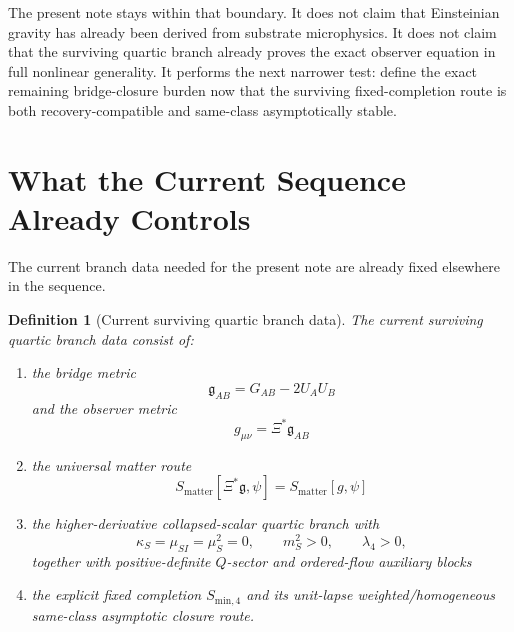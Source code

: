 \documentclass[11pt]{article}
\newcommand{\BridgeMetric}{\mathfrak{g}}
\newtheorem{definition}{Definition}
\begin{document}
The present note stays within that boundary. It does not claim that Einsteinian gravity has already been derived from substrate microphysics. It does not claim that the surviving quartic branch already proves the exact observer equation in full nonlinear generality. It performs the next narrower test: define the exact remaining bridge-closure burden now that the surviving fixed-completion route is both recovery-compatible and same-class asymptotically stable.

\section{What the Current Sequence Already Controls}

The current branch data needed for the present note are already fixed elsewhere in the sequence.

\begin{definition}[Current surviving quartic branch data]
\label{def:branch}
The \emph{current surviving quartic branch data} consist of:
\begin{enumerate}
    \item the bridge metric
    \begin{equation}
    \BridgeMetric_{AB}=G_{AB}-2U_AU_B
    \label{eq:bridge}
    \end{equation}
    and the observer metric
    \begin{equation}
    g_{\mu\nu}=\Xi^\ast\BridgeMetric_{AB}
    \label{eq:obsmetric}
    \end{equation}
    \item the universal matter route
    \begin{equation}
    S_{\mathrm{matter}}[\Xi^\ast\BridgeMetric,\psi]
    =
    S_{\mathrm{matter}}[g,\psi]
    \label{eq:matterroute}
    \end{equation}
    \item the higher-derivative collapsed-scalar quartic branch with
    \begin{equation}
    \kappa_S=\mu_{SI}=\mu_S^2=0,
    \qquad
    m_S^2>0,
    \qquad
    \lambda_4>0,
    \label{eq:quarticbaseline}
    \end{equation}
    together with positive-definite \(Q\)-sector and ordered-flow auxiliary blocks
    \item the explicit fixed completion \(S_{\mathrm{min},4}\) and its unit-lapse weighted/homogeneous same-class asymptotic closure route.
\end{enumerate}
\end{definition}
\end{document}

